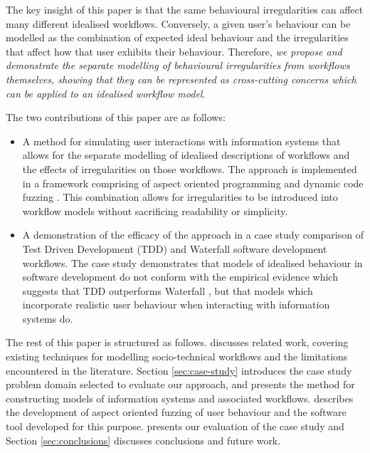 \documentclass{llncs}
\begin{document}
The key insight of this paper is that the same behavioural irregularities can affect many different idealised
workflows.  Conversely, a given user's behaviour can be modelled as the combination of expected ideal behaviour and the
irregularities that affect how that user exhibits their behaviour.  Therefore, \emph{we propose and demonstrate the
  separate modelling of behavioural irregularities from workflows themselves, showing that they can be represented as
  cross-cutting concerns which can be applied to an idealised workflow model}.

The two contributions of this paper are as follows:

\begin{itemize}

\item A method for simulating user interactions with information systems that allows for the separate modelling of
  idealised descriptions of workflows and the effects of irregularities on those
  workflows.  The approach is implemented in a framework comprising of aspect oriented
  programming \cite{filman01aspect} and dynamic code fuzzing
  \citep{takanen08fuzzing}.  This combination allows for irregularities to be introduced into workflow models
  without sacrificing readability
  or simplicity.

\item A demonstration of the efficacy of the approach in a case study comparison of Test Driven Development (TDD) and
  Waterfall software development workflows.  The case study demonstrates that models of idealised behaviour in software
  development do not conform with the empirical evidence which suggests that TDD outperforms Waterfall
  \citep{Bhat2006TestDrivenDevelopment,George2004TestDrivenDevelopment,Huang2009EmpiricalTestFirstProgramming}, but that
  models which incorporate realistic user behaviour when interacting with information systems do.

\end{itemize}

The rest of this paper is structured as follows.   discusses related work, covering existing
techniques for modelling socio-technical workflows and the limitations encountered in the literature.  Section
\ref{sec:case-study} introduces the case study problem domain selected to evaluate our approach, and presents the method
for constructing models of information systems and associated workflows.  describes the development of
aspect oriented fuzzing of user behaviour and the software tool developed for this purpose.  
presents our evaluation of the case study and Section \ref{sec:conclusions} discusses conclusions and future work.
\end{document}
